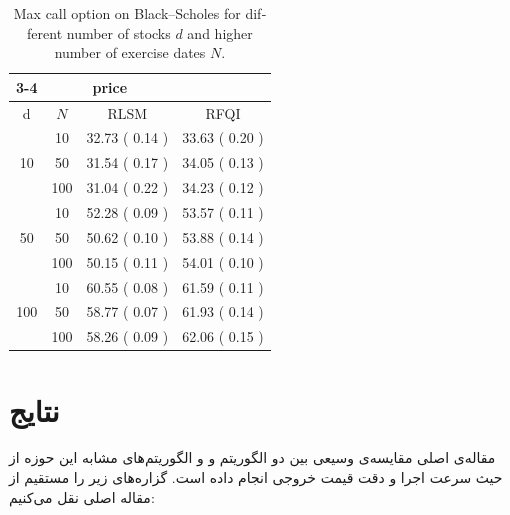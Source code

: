 \documentclass[hidelinks, 11pt]{article}
\begin{document}
\begin{latin}
\begin{table}[htbp]
\centering
\begin{tabular}{|cc|r|r|}
\cline{3-4}
\multicolumn{2}{}{}         &            \multicolumn{2}{|c|}{price}                     \\ \hline
d                   & $N$   & \multicolumn{1}{|c|}{RLSM} & \multicolumn{1}{|c|}{RFQI}    \\ \hline
                    & 10    & 32.73 ( 0.14 )             & 33.63 ( 0.20 )                \\
10                  & 50    & 31.54 ( 0.17 )             & 34.05 ( 0.13 )                \\
                    & 100   & 31.04 ( 0.22 )             & 34.23 ( 0.12 )                \\ \hline
                    & 10    & 52.28 ( 0.09 )             & 53.57 ( 0.11 )                \\
50                  & 50    & 50.62 ( 0.10 )             & 53.88 ( 0.14 )                \\
                    & 100   & 50.15 ( 0.11 )             & 54.01 ( 0.10 )                \\ \hline
                    & 10    & 60.55 ( 0.08 )             & 61.59 ( 0.11 )                \\
100                 & 50    & 58.77 ( 0.07 )             & 61.93 ( 0.14 )                \\
                    & 100   & 58.26 ( 0.09 )             & 62.06 ( 0.15 )                \\ \hline
\end{tabular}
\caption{Max call option on Black–Scholes for different number of stocks $d$ and higher number of exercise dates $N$.}
\end{table}
\end{latin}

\section{نتایج}
\label{sec:orgf706b32}

مقاله‌ی اصلی مقایسه‌ی وسیعی بین دو الگوریتم  و  و
الگوریتم‌های مشابه این حوزه از حیث سرعت اجرا و دقت قیمت خروجی انجام داده
است.  گزاره‌های زیر را مستقیم از مقاله اصلی نقل می‌کنیم:
\end{document}
